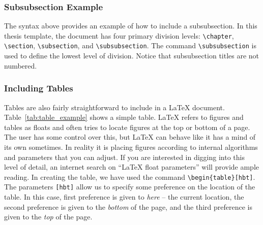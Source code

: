\subsubsection{Subsubsection Example}
The syntax above provides an example of how to include a subsubsection. In this thesis template, the document has four primary division levels: \verb|\chapter|, \verb|\section|, \verb|\subsection|, and \verb|\subsubsection|. The command \verb|\subsubsection| is used to define the lowest level of division. Notice that subsubsection titles are not numbered.

\subsubsection{Including Tables}
Tables are also fairly straightforward to include in a \LaTeX{} document. Table~\ref{tab:table_example} shows a simple table. \LaTeX{} refers to figures and tables as floats and often tries to locate figures at the top or bottom of a page. The user has some control over this, but \LaTeX{} can behave like it has a mind of its own sometimes. In reality it is placing figures according to internal algorithms and parameters that you can adjust. If you are interested in digging into this level of detail, an internet search on ``LaTeX float parameters'' will provide ample reading.  In creating the table, we have used the command \verb|\begin{table}[hbt]|. The parameters \verb|[hbt]| allow us to specify some preference on the location of the table. In this case, first preference is given to \emph{here} -- the current location, the second preference is given to the \emph{bottom} of the page, and the third preference is given to the \emph{top} of the page.

